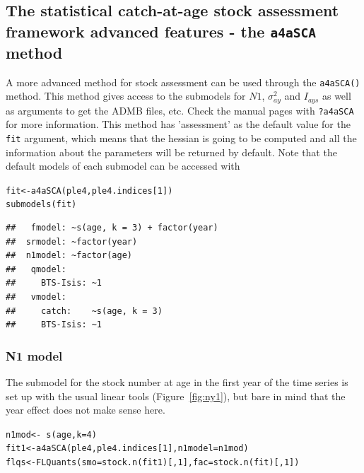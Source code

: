 \documentclass[a4paper,english,10pt]{article}\usepackage[]{graphicx}\usepackage[]{color}
\makeatletter
\newcommand{\hlnum}[1]{\textcolor[rgb]{0.2,0.2,0.2}{#1}}%
\newcommand{\hlopt}[1]{\textcolor[rgb]{0.2,0.2,0.2}{#1}}%
\newcommand{\hlstd}[1]{\textcolor[rgb]{0,0,0}{#1}}%
\newcommand{\hlkwb}[1]{\textcolor[rgb]{0.361,0.506,0.596}{#1}}%
\newcommand{\hlkwc}[1]{\textcolor[rgb]{0.361,0.506,0.596}{#1}}%
\newcommand{\hlkwd}[1]{\textcolor[rgb]{0.361,0.506,0.596}{#1}}%
\newenvironment{kframe}{%
 \def\at@end@of@kframe{}%
 \ifinner\ifhmode%
  \def\at@end@of@kframe{\end{minipage}}%
  \begin{minipage}{\columnwidth}%
 \fi\fi%
 \def\FrameCommand##1{\hskip\@totalleftmargin \hskip-\fboxsep
 \colorbox{shadecolor}{##1}\hskip-\fboxsep
     \hskip-\linewidth \hskip-\@totalleftmargin \hskip\columnwidth}%
 \MakeFramed {\advance\hsize-\width
   \@totalleftmargin\z@ \linewidth\hsize
   \@setminipage}}%
 {\par\unskip\endMakeFramed%
 \at@end@of@kframe}
\newenvironment{knitrout}{}{} %
\newcommand{\code}[1]{{\texttt{#1}}}
\makeatother
\begin{document}
\subsection{The statistical catch-at-age stock assessment framework advanced features - the \code{a4aSCA} method}

A more advanced method for stock assessment can be used through the \code{a4aSCA()} method. This method gives access to the submodels for $N1$, $\sigma^2_{ay}$ and $I_{ays}$ as well as arguments to get the ADMB files, etc. Check the manual pages with \code{?a4aSCA} for more information. This method has 'assessment' as the default value for the \code{fit} argument, which means that the hessian is going to be computed and all the information about the parameters will be returned by default. Note that the default models of each submodel can be accessed with

\begin{knitrout}
\color{fgcolor}\begin{kframe}
\begin{alltt}
\hlstd{fit} \hlkwb{<-} \hlkwd{a4aSCA}\hlstd{(ple4, ple4.indices[}\hlnum{1}\hlstd{])}
\hlkwd{submodels}\hlstd{(fit)}
\end{alltt}
\begin{verbatim}
## 	 fmodel: ~s(age, k = 3) + factor(year)
## 	srmodel: ~factor(year)
## 	n1model: ~factor(age)
## 	 qmodel:
## 	   BTS-Isis: ~1
## 	 vmodel:
## 	   catch:    ~s(age, k = 3)
## 	   BTS-Isis: ~1
\end{verbatim}
\end{kframe}
\end{knitrout}

\subsubsection{N1 model}

The submodel for the stock number at age in the first year of the time series is set up with the usual linear tools (Figure~\ref{fig:ny1}), but bare in mind that the year effect does not make sense here.

\begin{knitrout}
\color{fgcolor}\begin{kframe}
\begin{alltt}
\hlstd{n1mod} \hlkwb{<-} \hlopt{~}\hlkwd{s}\hlstd{(age,} \hlkwc{k}\hlstd{=}\hlnum{4}\hlstd{)}
\hlstd{fit1} \hlkwb{<-} \hlkwd{a4aSCA}\hlstd{(ple4, ple4.indices[}\hlnum{1}\hlstd{],} \hlkwc{n1model}\hlstd{=n1mod)}
\hlstd{flqs} \hlkwb{<-} \hlkwd{FLQuants}\hlstd{(}\hlkwc{smo}\hlstd{=}\hlkwd{stock.n}\hlstd{(fit1)[,}\hlnum{1}\hlstd{],} \hlkwc{fac}\hlstd{=}\hlkwd{stock.n}\hlstd{(fit)[,}\hlnum{1}\hlstd{])}
\end{alltt}
\end{kframe}
\end{knitrout}
\end{document}
